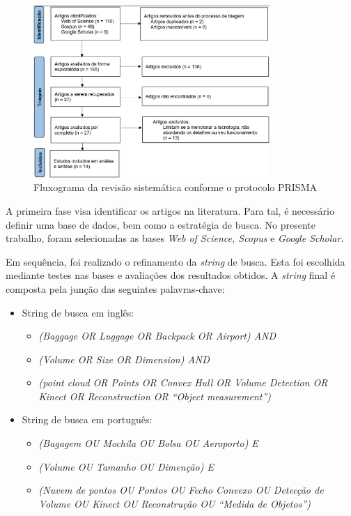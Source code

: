         \begin{figure}[h]
           \centering
           \includegraphics[width=0.8\textwidth]{imagens/Flux_revisao_sistematica_PRISMA.png} 
           \caption{Fluxograma da revisão sistemática conforme o protocolo PRISMA}
           \label{fig:flux_sistematic_revision}
        \end{figure}




    A primeira fase visa identificar os artigos na literatura. Para tal, é necessário definir uma base de dados, bem como a estratégia de busca. No presente trabalho, foram selecionadas as bases \textit{Web of Science, Scopus} e \textit{Google Scholar}.

    Em sequência, foi realizado o refinamento da \textit{string} de busca. Esta foi escolhida mediante testes nas bases e avaliações dos resultados obtidos. A \textit{string} final é composta pela junção das seguintes palavras-chave:

    \begin{itemize}
        \item String de busca em inglês:
        \begin{itemize}
            \item \textit{(Baggage OR Luggage OR Backpack OR Airport) AND}
            \item \textit{(Volume OR Size OR Dimension) AND}
            \item \textit{(point cloud OR Points OR Convex Hull OR Volume Detection OR Kinect OR Reconstruction OR “Object measurement”)}
        \end{itemize}
         \item String de busca em português:
        \begin{itemize}
            \item \textit{(Bagagem OU Mochila OU Bolsa OU Aeroporto) E}
            \item \textit{(Volume OU Tamanho OU Dimenção) E}
            \item \textit{(Nuvem de pontos OU Pontos OU Fecho Convexo OU Detecção de Volume OU Kinect OU Reconstrução OU “Medida de Objetos”)}
        \end{itemize}
    \end{itemize}
    
